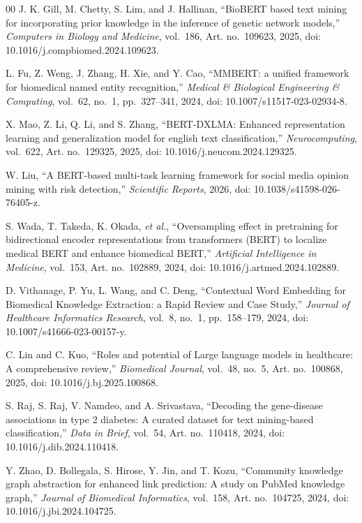 \documentclass[a4paper,10pt,conference]{IEEEtran}
\begin{document}
\begin{thebibliography}{00}
\setlength{\itemsep}{1.0pt plus 0.5pt minus 0.5pt}
 J. K. Gill, M. Chetty, S. Lim, and J. Hallinan, ``BioBERT based text mining for incorporating prior knowledge in the inference of genetic network models,'' \textit{Computers in Biology and Medicine}, vol.~186, Art. no.~109623, 2025, doi: 10.1016/j.compbiomed.2024.109623.

 L. Fu, Z. Weng, J. Zhang, H. Xie, and Y. Cao, ``MMBERT: a unified framework for biomedical named entity recognition,'' \textit{Medical \& Biological Engineering \& Computing}, vol.~62, no.~1, pp.~327--341, 2024, doi: 10.1007/s11517-023-02934-8.

 X. Mao, Z. Li, Q. Li, and S. Zhang, ``BERT-DXLMA: Enhanced representation learning and generalization model for english text classification,'' \textit{Neurocomputing}, vol.~622, Art. no.~129325, 2025, doi: 10.1016/j.neucom.2024.129325.

 W. Liu, ``A BERT-based multi-task learning framework for social media opinion mining with risk detection,'' \textit{Scientific Reports}, 2026, doi: 10.1038/s41598-026-76405-z.

 S. Wada, T. Takeda, K. Okada, \textit{et al.}, ``Oversampling effect in pretraining for bidirectional encoder representations from transformers (BERT) to localize medical BERT and enhance biomedical BERT,'' \textit{Artificial Intelligence in Medicine}, vol.~153, Art. no.~102889, 2024, doi: 10.1016/j.artmed.2024.102889.

 D. Vithanage, P. Yu, L. Wang, and C. Deng, ``Contextual Word Embedding for Biomedical Knowledge Extraction: a Rapid Review and Case Study,'' \textit{Journal of Healthcare Informatics Research}, vol.~8, no.~1, pp.~158--179, 2024, doi: 10.1007/s41666-023-00157-y.

 C. Lin and C. Kuo, ``Roles and potential of Large language models in healthcare: A comprehensive review,'' \textit{Biomedical Journal}, vol.~48, no.~5, Art. no.~100868, 2025, doi: 10.1016/j.bj.2025.100868.

 S. Raj, S. Raj, V. Namdeo, and A. Srivastava, ``Decoding the gene-disease associations in type 2 diabetes: A curated dataset for text mining-based classification,'' \textit{Data in Brief}, vol.~54, Art. no.~110418, 2024, doi: 10.1016/j.dib.2024.110418.

 Y. Zhao, D. Bollegala, S. Hirose, Y. Jin, and T. Kozu, ``Community knowledge graph abstraction for enhanced link prediction: A study on PubMed knowledge graph,'' \textit{Journal of Biomedical Informatics}, vol.~158, Art. no.~104725, 2024, doi: 10.1016/j.jbi.2024.104725.


\end{thebibliography}
\end{document}
